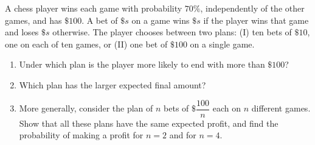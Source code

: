 A chess player wins each game with probability $70\%$, independently of the other games, and has $\$100$. A bet of $\$s$ on a game wins $\$s$ if the player wins that game and loses $\$s$ otherwise. The player chooses between two plans: (I) ten bets of $\$10$, one on each of ten games, or (II) one bet of $\$100$ on a single game.
\begin{enumerate}
\item[(a)] Under which plan is the player more likely to end with more than $\$100$?
\item[(b)] Which plan has the larger expected final amount?
\item[(c)] More generally, consider the plan of $n$ bets of $\$\dfrac{100}{n}$ each on $n$ different games. Show that all these plans have the same expected profit, and find the probability of making a profit for $n=2$ and for $n=4$.
\end{enumerate}
